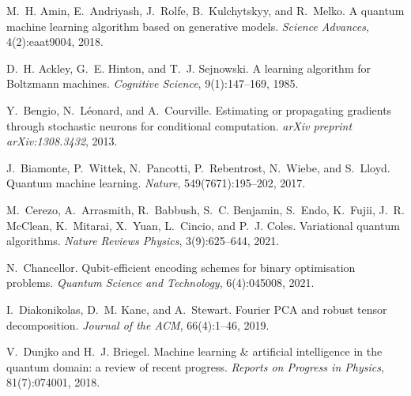 \documentclass[11pt,letterpaper]{article}
\begin{document}

\begin{thebibliography}{99}

M.~H. Amin, E.~Andriyash, J.~Rolfe, B.~Kulchytskyy, and R.~Melko.
\newblock A quantum machine learning algorithm based on generative models.
\newblock \emph{Science Advances}, 4(2):eaat9004, 2018.

D.~H. Ackley, G.~E. Hinton, and T.~J. Sejnowski.
\newblock A learning algorithm for Boltzmann machines.
\newblock \emph{Cognitive Science}, 9(1):147--169, 1985.

Y.~Bengio, N.~Léonard, and A.~Courville.
\newblock Estimating or propagating gradients through stochastic neurons for conditional computation.
\newblock \emph{arXiv preprint arXiv:1308.3432}, 2013.

J.~Biamonte, P.~Wittek, N.~Pancotti, P.~Rebentrost, N.~Wiebe, and S.~Lloyd.
\newblock Quantum machine learning.
\newblock \emph{Nature}, 549(7671):195--202, 2017.

M.~Cerezo, A.~Arrasmith, R.~Babbush, S.~C. Benjamin, S.~Endo, K.~Fujii, J.~R. McClean, K.~Mitarai, X.~Yuan, L.~Cincio, and P.~J. Coles.
\newblock Variational quantum algorithms.
\newblock \emph{Nature Reviews Physics}, 3(9):625--644, 2021.

N.~Chancellor.
\newblock Qubit-efficient encoding schemes for binary optimisation problems.
\newblock \emph{Quantum Science and Technology}, 6(4):045008, 2021.

I.~Diakonikolas, D.~M. Kane, and A.~Stewart.
\newblock Fourier PCA and robust tensor decomposition.
\newblock \emph{Journal of the ACM}, 66(4):1--46, 2019.

V.~Dunjko and H.~J. Briegel.
\newblock Machine learning \& artificial intelligence in the quantum domain: a review of recent progress.
\newblock \emph{Reports on Progress in Physics}, 81(7):074001, 2018.


\end{thebibliography}
\end{document}
